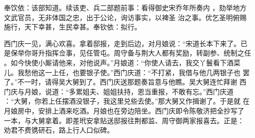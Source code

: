 奉饮依：该部知道。续该吏、兵二部题前事：看得御史宋乔年所奏内
，劾举地方文武官员，无非体国之忠，出于公论，询访事实，以裨圣
治之事。优乞圣明俯赐施行，天下幸甚，生民幸甚。奉钦依：拟行。

西门庆一见，满心欢喜。拿着邸报，走到后边，对月娘说：“宋道长本下来了。已
是保举你哥升指挥佥事，见任管屯。周守备与荆大人都有奖励，转副参、统制之任
。如今快使小厮请他来，对他说声。”月娘道：“你使人请去，我交丫鬟看下酒菜
儿。我愁他这一上任，也要银子使。”西门庆道：“不打紧，我借与他几两银子也
罢了。”不一时，请得吴大舅到了。西门庆送那题奏旨意与他瞧。吴大舅连忙拜谢
西门庆与月娘，说道：“多累姐夫、姐姐扶持，恩当重报，不敢有忘。”西门庆道
：“大舅，你若上任摆酒没银子，我这里兑些去使。”那大舅又作揖谢了。于是就
在月娘房中，安排上酒来吃酒。月娘也在旁边陪坐。西门庆即令陈敬济把全抄写了
一本，与大舅拿着。即差玳安拿贴送邸报往荆都监、周守御两家报喜去。正是：
劝君不费镌研石，路上行人口似碑。